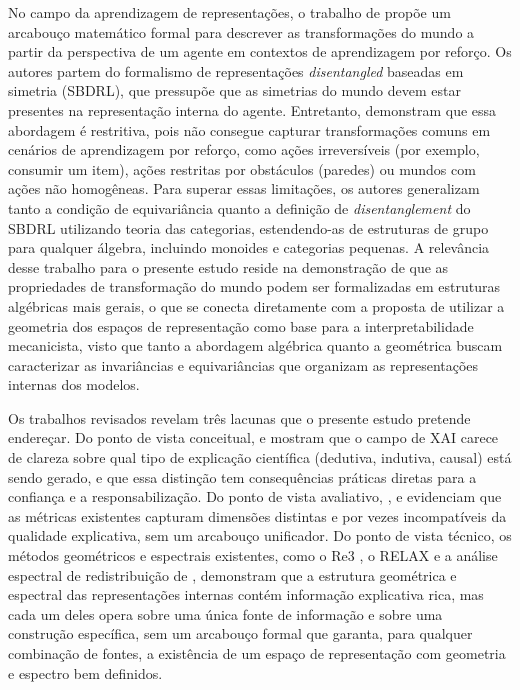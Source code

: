 No campo da aprendizagem de representações, o trabalho de \cite{Dean2025} propõe um arcabouço matemático formal para descrever as transformações do mundo a partir da perspectiva de um agente em contextos de aprendizagem por reforço. Os autores partem do formalismo de representações \textit{disentangled} baseadas em simetria (SBDRL), que pressupõe que as simetrias do mundo devem estar presentes na representação interna do agente. Entretanto, demonstram que essa abordagem é restritiva, pois não consegue capturar transformações comuns em cenários de aprendizagem por reforço, como ações irreversíveis (por exemplo, consumir um item), ações restritas por obstáculos (paredes) ou mundos com ações não homogêneas. Para superar essas limitações, os autores generalizam tanto a condição de equivariância quanto a definição de \textit{disentanglement} do SBDRL utilizando teoria das categorias, estendendo-as de estruturas de grupo para qualquer álgebra, incluindo monoides e categorias pequenas. A relevância desse trabalho para o presente estudo reside na demonstração de que as propriedades de transformação do mundo podem ser formalizadas em estruturas algébricas mais gerais, o que se conecta diretamente com a proposta de utilizar a geometria dos espaços de representação como base para a interpretabilidade mecanicista, visto que tanto a abordagem algébrica quanto a geométrica buscam caracterizar as invariâncias e equivariâncias que organizam as representações internas dos modelos.

Os trabalhos revisados revelam três lacunas que o presente estudo pretende endereçar. Do ponto de vista conceitual, \cite{Graff2025} e \cite{Erasmus2021} mostram que o campo de XAI carece de clareza sobre qual tipo de explicação científica (dedutiva, indutiva, causal) está sendo gerado, e que essa distinção tem consequências práticas diretas para a confiança e a responsabilização. Do ponto de vista avaliativo, \cite{Pawlicki2024}, \cite{Nauta2023} e \cite{Zhou2021} evidenciam que as métricas existentes capturam dimensões distintas e por vezes incompatíveis da qualidade explicativa, sem um arcabouço unificador. Do ponto de vista técnico, os métodos geométricos e espectrais existentes, como o Re3 \citep{Barua2026}, o RELAX \citep{Wickstrom2023} e a análise espectral de redistribuição de \cite{Mae2026}, demonstram que a estrutura geométrica e espectral das representações internas contém informação explicativa rica, mas cada um deles opera sobre uma única fonte de informação e sobre uma construção específica, sem um arcabouço formal que garanta, para qualquer combinação de fontes, a existência de um espaço de representação com geometria e espectro bem definidos.

